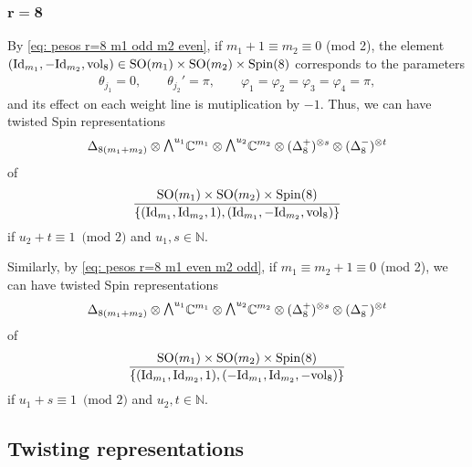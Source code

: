 \documentclass[10pt,a4paper]{amsart}
\newcommand{\ext}{\raise1pt\hbox{$\textstyle\bigwedge$}}
\numberwithin{equation}{section}
\begin{document}
\subsubsection[$r=8$]{$\boldsymbol{r=8}$}
By \eqref{eq: pesos r=8 m1 odd m2 even}, if $m_1+1\equiv m_2\equiv 0$ (mod 2), the element $({\rm Id}_{m_1},-{\rm Id}_{m_2},{\rm vol}_8)\in {\rm SO}(m_1)\times {\rm SO}(m_2)\times {\rm Spin}(8)$ corresponds to the parameters
\begin{gather*}
 \theta_{j_1} = 0 , \qquad \theta_{j_2}' = \pi , \qquad \varphi_1 = \varphi_2 = \varphi_3 = \varphi_4 = \pi,
\end{gather*}
and its ef\/fect on each weight line is mutiplication by $-1$. Thus, we can have twisted Spin representations
\begin{gather*}\Delta_{8(m_1+m_2)}\otimes \ext^{u_1} \mathbb{C}^{m_1}\otimes \ext^{u_2} \mathbb{C}^{m_2}\otimes(\Delta_8^+)^{\otimes s}\otimes (\Delta_8^-)^{\otimes t}\end{gather*}
of{\samepage
\begin{gather*}
{{\rm SO}(m_1)\times {\rm SO}(m_2)\times {\rm Spin}(8)\over \{({\rm Id}_{m_1},{\rm Id}_{m_2},1),({\rm Id}_{m_1},-{\rm Id}_{m_2},{\rm vol}_8)\}}\end{gather*} if $u_2+t\equiv 1\,\,\,\mbox{(mod 2)}$ and $u_1,s\in \mathbb{N}$.}

Similarly, by \eqref{eq: pesos r=8 m1 even m2 odd}, if $m_1\equiv m_2+1\equiv 0$ (mod 2), we can have twisted Spin representations
\begin{gather*}\Delta_{8(m_1+m_2)}\otimes \ext^{u_1} \mathbb{C}^{m_1}\otimes \ext^{u_2} \mathbb{C}^{m_2}\otimes(\Delta_8^+)^{\otimes s}\otimes (\Delta_8^-)^{\otimes t} \end{gather*}
of
\begin{gather*}
{{\rm SO}(m_1)\times {\rm SO}(m_2)\times {\rm Spin}(8)\over \{({\rm Id}_{m_1},{\rm Id}_{m_2},1),(-{\rm Id}_{m_1},{\rm Id}_{m_2},-{\rm vol}_8)\}}
\end{gather*} if
$u_1+s\equiv 1\,\,\,\mbox{(mod 2)}$ and $u_2,t\in \mathbb{N}.$

\subsection{Twisting representations}\label{subsec: conditions 2}
\end{document}
